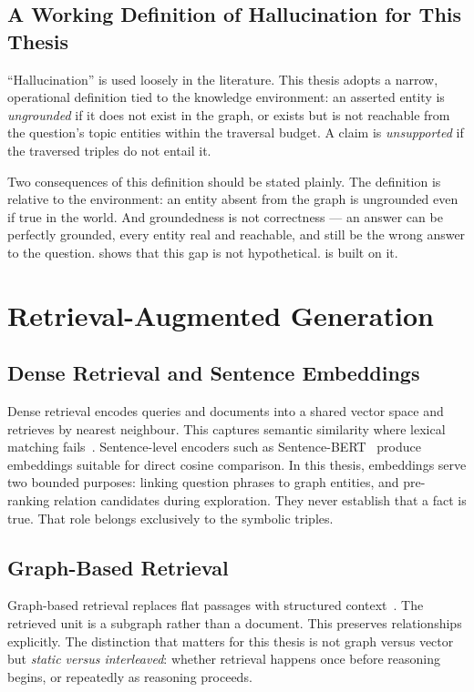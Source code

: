 \subsection{A Working Definition of Hallucination for This
Thesis}\label{sec:hallucination-def}

``Hallucination'' is used loosely in the literature. This thesis adopts a
narrow, operational definition tied to the knowledge
environment: an asserted entity is \emph{ungrounded} if it does not exist in the
graph, or exists but is not reachable from the question's topic entities within
the traversal budget. A claim is \emph{unsupported} if the traversed triples do
not entail it.

Two consequences of this definition should be stated plainly. The definition is
relative to the environment: an entity absent from the graph is ungrounded even
if true in the world. And groundedness is not correctness --- an answer can be
perfectly grounded, every entity real and reachable, and still be the wrong
answer to the question.  shows that this gap is not
hypothetical.  is built on it.

\section{Retrieval-Augmented Generation}\label{sec:rag}

\subsection{Dense Retrieval and Sentence Embeddings}

Dense retrieval encodes queries and documents into a shared vector space and
retrieves by nearest neighbour. This captures semantic similarity where lexical
matching fails~\cite{karpukhin2020dense}. Sentence-level encoders such as
Sentence-BERT~\cite{reimers2019sentence} produce embeddings suitable for direct
cosine comparison. In this thesis, embeddings serve two bounded purposes:
linking question phrases to graph entities, and pre-ranking relation candidates
during exploration. They never establish that a fact is true. That role
belongs exclusively to the symbolic triples.

\subsection{Graph-Based Retrieval}

Graph-based retrieval replaces flat passages with structured
context~\cite{edge2024local,gutierrez2024hipporag}. The retrieved unit is a
subgraph rather than a document. This preserves relationships explicitly. The
distinction that matters for this thesis is not graph versus vector but
\emph{static versus interleaved}: whether retrieval happens once before
reasoning begins, or repeatedly as reasoning proceeds.

